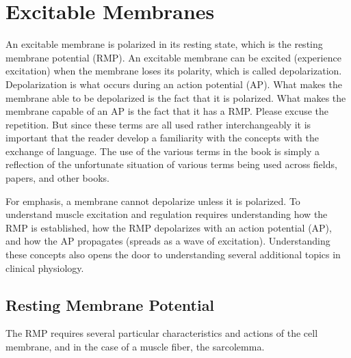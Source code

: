 \section{Excitable Membranes}

An excitable membrane is polarized in its resting state, which is the resting membrane potential (RMP). An excitable membrane can be excited (experience excitation) when the membrane loses its polarity, which is called depolarization. Depolarization is what occurs during an action potential (AP). What makes the membrane able to be depolarized is the fact that it is polarized. What makes the membrane capable of an AP is the fact that it has a RMP. Please excuse the repetition. But since these terms are all used rather interchangeably it is important that the reader develop a familiarity with the concepts with the exchange of language. The use of the various terms in the book is simply a reflection of the unfortunate situation of various terms being used across fields, papers, and other books.

For emphasis, a membrane cannot depolarize unless it is polarized. To understand muscle excitation and regulation\footnotemark{} requires understanding how the RMP is established, how the RMP depolarizes with an action potential (AP), and how the AP propagates (spreads as a wave of excitation). Understanding these concepts also opens the door to understanding several additional topics in clinical physiology. 



\subsection{Resting Membrane Potential}

The RMP requires several particular characteristics and actions of the cell membrane, and in the case of a muscle fiber, the sarcolemma.

